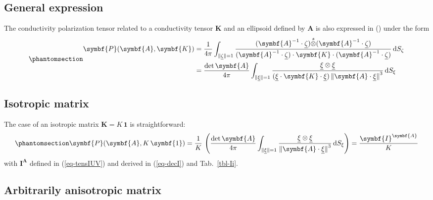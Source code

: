 \documentclass[
  a4paper,
  numbers=noendperiod,
  DIV=12]{scrreprt}
\newcommand{\uu}[1]{{\symbf{{#1}}}}
\newcommand{\uv}[1]{{\underline{{#1}}}}
\newcommand{\sotimes}{{\stackrel{s}{\otimes}}}
\newcommand{\norm}[1]{{\lVert{{#1}}\rVert}}
\newcommand{\ud}{{\,\mathrm{d}}}
\begin{document}
\subsection{General expression}\label{general-expression-1}

The conductivity polarization tensor related to a conductivity tensor
\(\uu{K}\) and an ellipsoid defined by \(\uu{A}\) is also expressed in
() under the form
\begin{equation}\protect\phantomsection\label{eq-Hillcond}{\begin{align}
\uu{P}(\uu{A},\uu{K})&=\frac{1}{4\pi}
\int_{\norm{\uv{\zeta}}=1}
\frac{(\uu{A}^{-1}\cdot\uv{\zeta})\sotimes(\uu{A}^{-1}\cdot\uv{\zeta})}
{(\uu{A}^{-1}\cdot\uv{\zeta})\cdot\uu{K}
\cdot(\uu{A}^{-1}\cdot\uv{\zeta})}
\ud S_\zeta\\
&=
\frac{\det{\uu{A}}}{4\pi}
\int_{\norm{\uv{\xi}}=1}
\frac{\uv{\xi}\otimes\uv{\xi}}{(\uv{\xi}\cdot\uu{K}\cdot\uv{\xi})\,\norm{\uu{A}\cdot\uv{\xi}}^3}
\ud S_{\xi}
\end{align}}\end{equation}

\subsection{Isotropic matrix}\label{isotropic-matrix-3}

The case of an isotropic matrix \(\uu{K}=K\,\uu{1}\) is straightforward:
\begin{equation}\protect\phantomsection\label{eq-Hillcondiso}{
\uu{P}(\uu{A},K\,\uu{1})=
\frac{1}{K}\,
\left(
\frac{\det{\uu{A}}}{4\pi}
\int_{\norm{\uv{\xi}}=1}
\frac{\uv{\xi}\otimes\uv{\xi}}{\norm{\uu{A}\cdot\uv{\xi}}^3}
\ud S_{\xi}\right)
=
\frac{\uu{I}^{\uu{A}}}{K}
}\end{equation} with \(\uu{I}^{\uu{A}}\) defined in (\ref{eq-tensIUV})
and derived in (\ref{eq-decI}) and Tab.~\ref{tbl-Ii}.

\subsection{Arbitrarily anisotropic
matrix}\label{arbitrarily-anisotropic-matrix}
\end{document}
